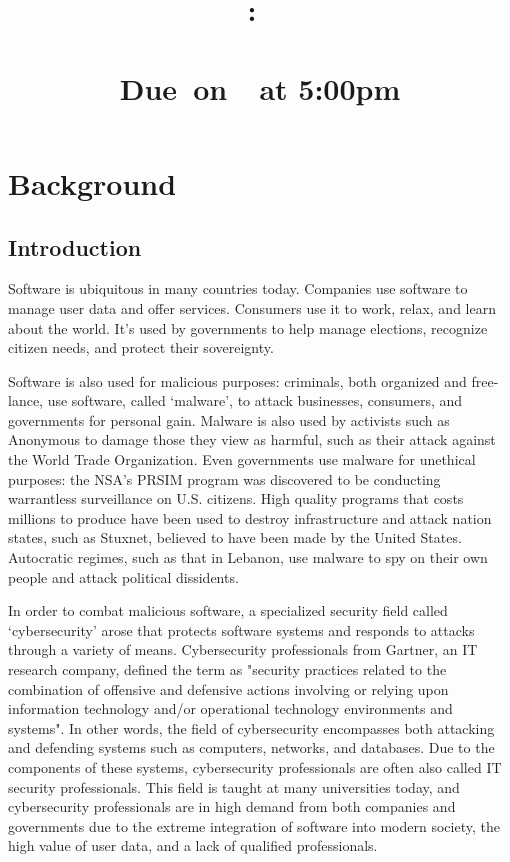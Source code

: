 \documentclass[openright]{report}
\title{
    \vspace{2in}
    \LARGE{\textbf{\projectTitle}}\\
    \vspace{0.1in}\large{\reportClass:\ \reportTopic}\\
    \vspace{0.1in}\large{\reportClassInstructor}\\
    \normalsize\vspace{0.1in}\large{Due\ on\ \reportDueDate\ at 5:00pm}
    \vspace{1.4in}
}
\author{\reportAuthorName}
\date{}
\begin{document}
\maketitle

\large{\tableofcontents}

\chapter{Background}

\section{Introduction}

\par Software is ubiquitous in many countries today. Companies use software to manage user data and offer services. Consumers use it to work, relax, and learn about the world. It's used by governments to help manage elections, recognize citizen needs, and protect their sovereignty. 

\par Software is also used for malicious purposes: criminals, both organized and free-lance, use software, called `malware', to attack businesses, consumers, and governments for personal gain. Malware is also used by activists such as Anonymous to damage those they view as harmful, such as their attack against the World Trade Organization\cite{anonymous_attack}. Even governments use malware for unethical purposes: the NSA's PRSIM program was discovered to be conducting warrantless surveillance on U.S. citizens\cite{nsa_illegal}. High quality programs that costs millions to produce have been used to destroy infrastructure and attack nation states, such as Stuxnet, believed to have been made by the United States\cite{stuxnet}. Autocratic regimes, such as that in Lebanon, use malware to spy on their own people and attack political dissidents\cite{lebanon}.

\par In order to combat malicious software, a specialized security field called `cybersecurity' arose that protects software systems and responds to attacks through a variety of means. Cybersecurity professionals from Gartner, an IT research company, defined the term as "security practices related to the combination of offensive and defensive actions involving or relying upon information technology and/or operational technology environments and systems"\cite{cyber_def}. In other words, the field of cybersecurity encompasses both attacking and defending systems such as computers, networks, and databases. Due to the components of these systems, cybersecurity professionals are often also called IT security professionals. This field is taught at many universities today, and cybersecurity professionals are in high demand from both companies and governments due to the extreme integration of software into modern society, the high value of user data, and a lack of qualified professionals.
\end{document}
